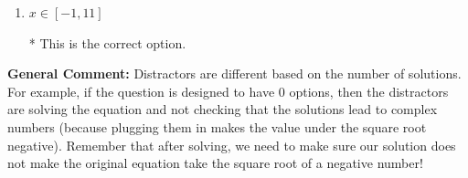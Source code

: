 \documentclass{extbook}[14pt]
\begin{document}
\begin{enumerate}
{\begin{enumerate}[label=\Alph*.]
$x = -4.000$, which corresponds to thinking this value does not make either radicand negative AND the value $x = 2.000$ does.
\item \( x \in [-1,11] \)

* This is the correct option.
\end{enumerate}

\textbf{General Comment:} Distractors are different based on the number of solutions. For example, if the question is designed to have 0 options, then the distractors are solving the equation and not checking that the solutions lead to complex numbers (because plugging them in makes the value under the square root negative). Remember that after solving, we need to make sure our solution does not make the original equation take the square root of a negative number!
}
\end{enumerate}
\end{document}
